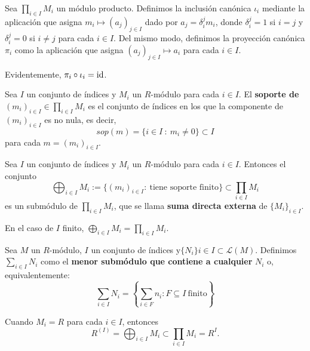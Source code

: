 \begin{df}
  Sea \(\prod_{i\in I} M_i\) un módulo producto. Definimos
  la inclusión canónica \(\iota_i\)  mediante la
  aplicación que asigna \(m_i\mapsto {(a_j)}_{j\in I}\) dado por
  \(a_j=\delta_i^j m_i\), donde \(\delta_i^j = 1\) si \(i = j\) y
  \(\delta_i^j = 0\) si \(i \neq j\) para cada \(i \in I\).
  Del mismo modo, definimos la proyección canónica \(\pi_i\) como
  la aplicación que asigna \({(a_j)}_{j\in I}\mapsto a_i\) para cada
  \(i \in I\).

  Evidentemente, \(\pi_i\circ\iota_i=\operatorname{id}\).
\end{df}

\begin{df}[Soporte]
  Sea \(I\) un conjunto de índices y \(M_i\) un \(R\)-módulo para cada
  \(i \in I\). El \textbf{soporte de} \((m_i)_{i \in I} \in \prod_{i \in I}M_i\)
  es el conjunto de índices
  en los que la componente de \((m_i)_{i \in I}\) es no nula, es decir,
  \[
    sop(m) = \{i \in I \ : \ m_i \neq 0\} \subset I
  \]
  para cada \(m = (m_i)_{i \in I}\).
\end{df}

\begin{lema}
  Sea \(I\) un conjunto de índices y \(M_i\) un \(R\)-módulo para cada
  \(i \in I\). Entonces el conjunto
  \[
    \bigoplus_{i\in I} M_i:=\{{(m_i)}_{i\in I}: \ \textrm{tiene soporte
      finito}\} \subset \prod_{i \in I} M_i
  \]
  es un submódulo de \(\prod_{i \in I} M_i\), que se llama \textbf{suma directa
    externa} de \(\{M_i\}_{i \in I}\).
\end{lema}


En el caso de \(I\) finito, \(\bigoplus_{i\in I} M_i=\prod_{i\in I} M_i\).

\begin{df}
  Sea \(M\) un \(R\)-módulo, \(I\) un conjunto de índices y\(\{N_i\}{i \in I}
  \subset \mathcal{L}(M)\).
  Definimos \(\sum_{i\in I} N_i\) como el \textbf{menor submódulo que contiene
  a cualquier} \(N_i\) o, equivalentemente:
  \[
    \sum_{i\in I} N_i=\left\{\sum_{i\in F} n_i: F \subseteq I \ \textrm{finito}\right\}
  \]
\end{df}

\begin{ejemplo}
  Cuando \(M_i = R\) para cada \(i \in I\), entonces
  \[
    R^{(I)} = \bigoplus_{i \in I} M_i \subset \prod_{i \in I} M_i = R^I.
  \]
\end{ejemplo}

